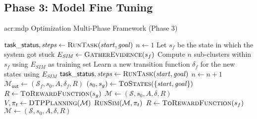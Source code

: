 \subsection{Phase 3: Model Fine Tuning}
\label{sec:phase-3}

\begin{algorithm}[t!]
	\caption{\acrshort{acr:mdp} Optimization Multi-Phase Framework (Phase 3)}
	\label{alg:multi-phase-fine-tuning}
	\begin{algorithmic}[1]
		\Require{\acrshort{acr:mdp} $\mathcal{M}_\mathsf{in} = (\mathcal{S}, s_0, A, \delta, R)$, Set of tasks $T$, Time-step $t$, Discount factor $\gamma \in [0, 1)$}
		\Statex
			\State $\mathsf{task\_status}, \mathit{steps} \gets \textproc{RunTask}(\mathit{start}, \mathit{goal})$
			\State $n \gets 1$
				\State Let $s_f$ be the state in which the system got stuck
				\State $E_\mathit{SIM} \gets \textproc{GatherEvidence}(s_f)$
				\State Compute $n$ sub-clusters within $s_f$ using $E_\mathit{SIM}$ as training set
				\State Learn a new transition function $\delta_f$ for the new states using $E_\mathit{SIM}$
				\State $\mathsf{task\_status}, \mathit{steps} \gets \textproc{RunTask}(\mathit{start}, \mathit{goal})$
				\State $n \gets n + 1$ 
			\EndWhile
		\EndFor
		\State\Return $\mathcal{M}_\mathsf{out} \gets (\mathcal{S}_f, s_0, A, \delta_f, R)$ 
		\EndFunction
		\Statex
			\State $(s_0, s_g) \gets \textproc{ToStates}(\{\mathit{start}, \mathit{goal}\})$
			\State $R \gets \textproc{ToRewardFunction}(s_g)$
			\State $\mathcal{M} \gets (\mathcal{S}, s_0, A, \delta, R)$
			\State $V, \pi_t \gets \textproc{DTPPlanning}(\mathcal{M})$
			\State\Return $\textproc{RunSim}(\mathcal{M}, \pi_t)$	
		\EndFunction
		\Statex
			\State $R \gets \textproc{ToRewardFunction}(s_f)$
			\State $\mathcal{M} \gets (\mathcal{S}, s_0, A, \delta, R)$

\end{algorithmic}
\end{algorithm}
